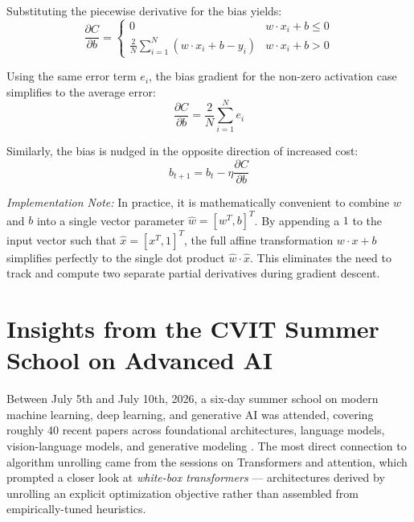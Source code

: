 \documentclass[conference]{IEEEtran}
\begin{document}
Substituting the piecewise derivative for the bias yields:
\begin{equation}
\frac{\partial C}{\partial b} = 
\begin{cases} 
0 & w \cdot x_i + b \le 0 \\ 
\frac{2}{N} \sum_{i=1}^N (w \cdot x_i + b - y_i) & w \cdot x_i + b > 0 
\end{cases}
\end{equation}

Using the same error term $e_i$, the bias gradient for the non-zero activation case simplifies to the average error:
\begin{equation}
\frac{\partial C}{\partial b} = \frac{2}{N} \sum_{i=1}^N e_i
\end{equation}

Similarly, the bias is nudged in the opposite direction of increased cost:
\begin{equation}
b_{t+1} = b_t - \eta \frac{\partial C}{\partial b}
\end{equation}

\textit{Implementation Note:} In practice, it is mathematically convenient to combine $w$ and $b$ into a single vector parameter $\hat{w} = [w^T, b]^T$. By appending a $1$ to the input vector such that $\hat{x} = [x^T, 1]^T$, the full affine transformation $w \cdot x + b$ simplifies perfectly to the single dot product $\hat{w} \cdot \hat{x}$. This eliminates the need to track and compute two separate partial derivatives during gradient descent.

\section{Insights from the CVIT Summer School on Advanced AI}
Between July 5th and July 10th, 2026, a six-day summer school on modern machine learning, deep learning, and generative AI was attended, covering roughly 40 recent papers across foundational architectures, language models, vision-language models, and generative modeling \cite{vaswani2017attention, tolstikhin2021mlp, sun2023retentive, openx2023}. The most direct connection to algorithm unrolling came from the sessions on Transformers and attention, which prompted a closer look at \textit{white-box transformers} — architectures derived by unrolling an explicit optimization objective rather than assembled from empirically-tuned heuristics.
\end{document}
